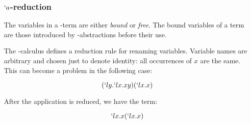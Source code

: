 \subsubsection{$`a$-reduction}
 
  The variables in a \lam-term are either \emph{bound} or \emph{free}. 
  The bound variables of a term are those introduced by \lam-abstractions before their use.
 
 
  The \lam-calculus defines a reduction rule for renaming variables.
  Variable names are arbitrary and chosen just to denote identity:
  all occurrences of $x$ are the same. This can become a problem
  in the following case:
  
  \[
    (`ly.`lx.xy)(`lx.x)
  \]
 
  After the application is reduced, we have the term:
  
  \[
    `lx.x(`lx.x) 
  \]
  
